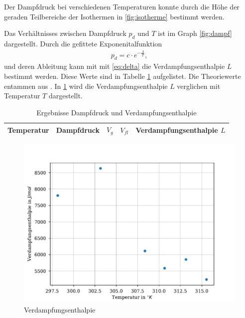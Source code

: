 \documentclass[11pt, a4paper]{article}
\begin{document}
    Der Dampfdruck bei verschiedenen Temperaturen konnte durch die Höhe der geraden Teilbereiche
    der Isothermen in \ref{fig:isotherme} bestimmt werden.
    

   Das Verhältnisses zwischen Dampfdruck $p_d$ und $T$ ist im Graph \ref{fig:dampf} dargestellt.
   Durch die gefittete Exponenitalfunktion
    \begin{align}
        p_d = c \cdot e^{-\frac{A}{T}},
    \end{align}
    und deren Ableitung kann mit mit \ref{eq:delta}
    die Verdampfungsenthalpie $L$ bestimmt werden. Diese Werte sind in Tabelle \ref{tab:dampfmess}
    aufgelistet. Die Theoriewerte entammen aus \cite{SH6}. In \ref{fig:verd} wird die Verdampfungsenthalpie $L$ verglichen mit Temperatur $T$ dargestellt.
    \begin{table}
        \begin{adjustwidth}{-.5in}{-.5in}
        \centering
        \begin{tabular}{c c c c c}
            Temperatur & Dampfdruck & $V_g$ & $V_{fl}$ & Verdampfungsenthalpie $L$ \\ \hline
            
            
        \end{tabular}
        
        \caption{Ergebnisse Dampfdruck und Verdampfungsenthalpie}\label{tab:dampfmess}
        \end{adjustwidth}
    \end{table}
    \begin{figure}
        \centering
        \includegraphics[width=\textwidth]{./Plots/verd.pdf}

        \caption{Verdampfungsenthalpie}
        \label{fig:verd}
    \end{figure}
\end{document}
